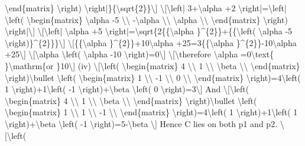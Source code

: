 \textbackslash end\{matrix\} \textbackslash right) \textbackslash right|\}\{\textbackslash sqrt\{2\}\}\textbackslash{]}
\textbackslash{[}\textbackslash left| 3+\textbackslash alpha +2
\textbackslash right|=\textbackslash left| \textbackslash left(
\textbackslash begin\{matrix\} \textbackslash alpha -5 \textbackslash\textbackslash{}
-\textbackslash alpha \textbackslash\textbackslash{} \textbackslash alpha
\textbackslash\textbackslash{} \textbackslash end\{matrix\} \textbackslash right)
\textbackslash right|\textbackslash{]} \textbackslash{[}\textbackslash left|
\textbackslash alpha +5 \textbackslash right|=\textbackslash sqrt\{2\{\{\textbackslash alpha
\}\textasciicircum\{2\}\}+\{\{\textbackslash left( \textbackslash alpha
-5 \textbackslash right)\}\textasciicircum\{2\}\}\}\textbackslash{]}
\textbackslash{[}\{\{\textbackslash alpha \}\textasciicircum\{2\}\}+10\textbackslash alpha
+25=3\{\{\textbackslash alpha \}\textasciicircum\{2\}\}-10\textbackslash alpha
+25\textbackslash{]} \textbackslash{[}\textbackslash alpha \textbackslash left(
\textbackslash alpha -10 \textbackslash right)=0\textbackslash{]}
\textbackslash{[}\textbackslash therefore \textbackslash alpha
=0\textbackslash text\{ \}\textbackslash mathrm\{or \}10\textbackslash{]}
(iv) \textbackslash{[}\textbackslash left( \textbackslash begin\{matrix\}
4 \textbackslash\textbackslash{} 1 \textbackslash\textbackslash{}
\textbackslash beta \textbackslash\textbackslash{} \textbackslash end\{matrix\}
\textbackslash right)\textbackslash bullet \textbackslash left(
\textbackslash begin\{matrix\} 1 \textbackslash\textbackslash{}
-1 \textbackslash\textbackslash{} 0 \textbackslash\textbackslash{}
\textbackslash end\{matrix\} \textbackslash right)=4\textbackslash left(
1 \textbackslash right)+1\textbackslash left( -1 \textbackslash right)+\textbackslash beta
\textbackslash left( 0 \textbackslash right)=3\textbackslash{]}
And \textbackslash{[}\textbackslash left( \textbackslash begin\{matrix\}
4 \textbackslash\textbackslash{} 1 \textbackslash\textbackslash{}
\textbackslash beta \textbackslash\textbackslash{} \textbackslash end\{matrix\}
\textbackslash right)\textbackslash bullet \textbackslash left(
\textbackslash begin\{matrix\} 1 \textbackslash\textbackslash{}
1 \textbackslash\textbackslash{} -1 \textbackslash\textbackslash{}
\textbackslash end\{matrix\} \textbackslash right)=4\textbackslash left(
1 \textbackslash right)+1\textbackslash left( 1 \textbackslash right)+\textbackslash beta
\textbackslash left( -1 \textbackslash right)=5-\textbackslash beta
\textbackslash{]} Hence C lies on both p1 and p2. \textbackslash{[}\textbackslash left(
